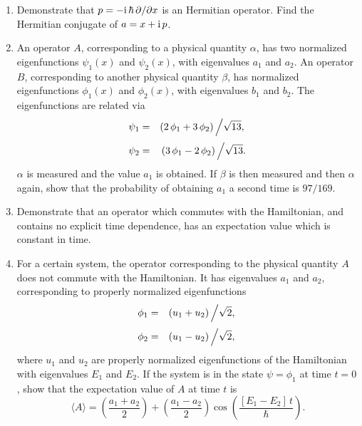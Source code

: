 {\begin{enumerate}
\item Demonstrate that $p=-{\rm i}\,\hbar\,\partial/\partial x$ is an Hermitian
operator. Find the Hermitian conjugate of $a = x + {\rm i}\,p$.
 
\item An  operator $A$, corresponding to a physical quantity $\alpha$, has
two normalized eigenfunctions $\psi_1(x)$ and $\psi_2(x)$, with eigenvalues
$a_1$ and $a_2$. An operator $B$, corresponding to another physical
quantity $\beta$, has normalized eigenfunctions $\phi_1(x)$ and $\phi_2(x)$,
with eigenvalues $b_1$ and $b_2$. The eigenfunctions are
related via
\begin{eqnarray}
\psi_1 &=& (2\,\phi_1+3\,\phi_2) \left/ \sqrt{13},\right.\nonumber\\[0.5ex]
\psi_2 &=& (3\,\phi_1-2\,\phi_2) \left/ \sqrt{13}.\right.\nonumber
\end{eqnarray}
$\alpha$ is measured and the value $a_1$ is obtained. If $\beta$ is then measured and then $\alpha$ again, show that the probability of obtaining
$a_1$ a second time is $97/169$.

\item Demonstrate that an  operator which commutes with the
Hamiltonian, and contains no explicit time dependence, has an expectation
value which is constant in time.

\item For a certain system, the operator corresponding to the physical
quantity $A$ does not commute with the Hamiltonian. It has
eigenvalues $a_1$ and $a_2$, corresponding to properly normalized eigenfunctions
\begin{eqnarray}
\phi_1 &=& (u_1+u_2)\left/\sqrt{2},\right.\nonumber\\[0.5ex]
\phi_2 &=& (u_1-u_2)\left/\sqrt{2},\right.\nonumber
\end{eqnarray}
where $u_1$ and $u_2$ are properly normalized eigenfunctions of the
Hamiltonian with eigenvalues $E_1$ and $E_2$. If the system is in the
state $\psi=\phi_1$ at time $t=0$, show that the expectation value of $A$
at time $t$ is
$$
\langle A\rangle = \left(\frac{a_1+a_2}{2}\right) + \left(\frac{a_1-a_2}{2}\right)\cos\left(\frac{[E_1-E_2]\,t}{\hbar}\right).
$$

\end{enumerate}
}